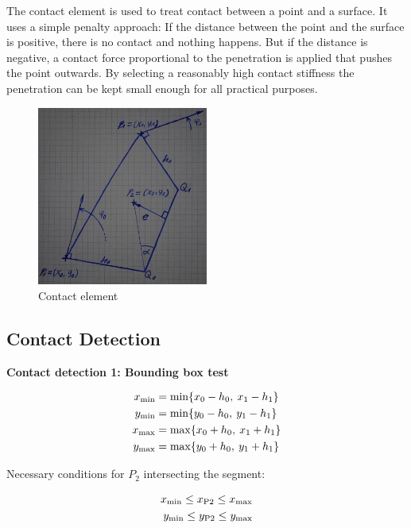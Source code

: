 The contact element is used to treat contact between a point and a surface. It uses a simple penalty approach: If the distance between the point and the surface is positive, there is no contact and nothing happens. But if the distance is negative, a contact force proportional to the penetration is applied that pushes the point outwards. By selecting a reasonably high contact stiffness the penetration can be kept small enough for all practical purposes.

\begin{figure}[h]
\centering
\includegraphics[width=0.5\textwidth]{figures/elements/contact_element_0}
\caption{Contact element}
\end{figure}

\subsection{Contact Detection}

\textbf{Contact detection 1: Bounding box test}

\begin{align*}
x_{\rm{min}} &= \min\{x_0 - h_0,\:x_1 - h_1\}\\
y_{\rm{min}} &= \min\{y_0 - h_0,\:y_1 - h_1\}\\
x_{\rm{max}} &= \max\{x_0 + h_0,\:x_1 + h_1\}\\
y_{\rm{max}} &= \max\{y_0 + h_0,\:y_1 + h_1\}
\end{align*}

Necessary conditions for $P_2$ intersecting the segment:

\begin{align*}
x_{\rm{min}} \le x_{\rm{P2}} \le x_{\rm{max}}\\
y_{\rm{min}} \le y_{\rm{P2}} \le y_{\rm{max}}
\end{align*}

